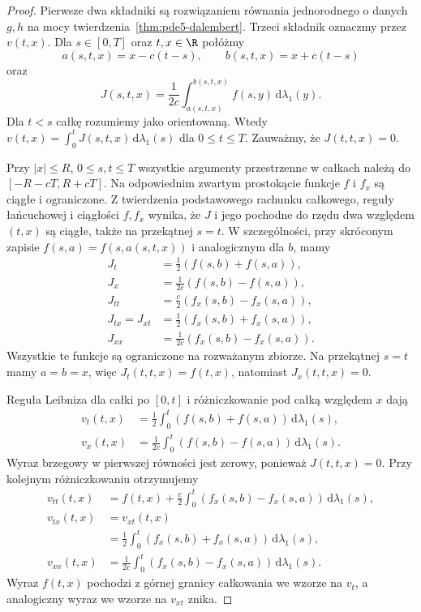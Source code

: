 \begin{proof}
Pierwsze dwa składniki są rozwiązaniem równania
jednorodnego o danych $g,h$ na mocy
twierdzenia~\ref{thm:pde5-dalembert}.
Trzeci składnik oznaczmy przez $v(t,x)$.
Dla $s\in[0,T]$ oraz $t,x\in\R$ połóżmy
\[
 a(s,t,x)=x-c(t-s),\qquad b(s,t,x)=x+c(t-s)
\]
oraz
\[
 J(s,t,x)=\frac1{2c}
 \int_{a(s,t,x)}^{b(s,t,x)}f(s,y)\,\mathrm d\lambda_1(y).
\]
Dla $t<s$ całkę rozumiemy jako orientowaną.
Wtedy $v(t,x)=\int_0^t J(s,t,x)\,\mathrm d\lambda_1(s)$
dla $0\leq t\leq T$. Zauważmy, że $J(t,t,x)=0$.

Przy $|x|\leq R$, $0\leq s,t\leq T$ wszystkie
argumenty przestrzenne w całkach należą do
$[-R-cT,R+cT]$. Na odpowiednim zwartym
prostokącie funkcje $f$ i $f_x$ są ciągłe
i ograniczone. Z twierdzenia podstawowego
rachunku całkowego, reguły łańcuchowej i
ciągłości $f,f_x$ wynika, że $J$ i jego
pochodne do rzędu dwa względem $(t,x)$
są ciągłe, także na przekątnej $s=t$.
W szczególności, przy skróconym zapisie
$f(s,a)=f(s,a(s,t,x))$ i analogicznym dla $b$,
mamy
\[
 \begin{aligned}
 J_t&=\tfrac12(f(s,b)+f(s,a)),\\
 J_x&=\tfrac1{2c}(f(s,b)-f(s,a)),\\
 J_{tt}&=\tfrac c2(f_x(s,b)-f_x(s,a)),\\
 J_{tx}=J_{xt}&=\tfrac12(f_x(s,b)+f_x(s,a)),\\
 J_{xx}&=\tfrac1{2c}(f_x(s,b)-f_x(s,a)).
 \end{aligned}
\]
Wszystkie te funkcje są ograniczone na rozważanym
zbiorze. Na przekątnej $s=t$ mamy $a=b=x$,
więc $J_t(t,t,x)=f(t,x)$, natomiast
$J_x(t,t,x)=0$.

Reguła Leibniza dla całki po $[0,t]$
i różniczkowanie pod całką względem $x$ dają
\[
 \begin{aligned}
 v_t(t,x)&=\tfrac12\int_0^t
       (f(s,b)+f(s,a))\,\mathrm d\lambda_1(s),\\
 v_x(t,x)&=\tfrac1{2c}\int_0^t
       (f(s,b)-f(s,a))\,\mathrm d\lambda_1(s).
 \end{aligned}
\]
Wyraz brzegowy w pierwszej równości jest zerowy,
ponieważ $J(t,t,x)=0$.
Przy kolejnym różniczkowaniu otrzymujemy
\[
 \begin{aligned}
 v_{tt}(t,x)&=f(t,x)+\tfrac c2\int_0^t
       (f_x(s,b)-f_x(s,a))\,\mathrm d\lambda_1(s),\\
 v_{tx}(t,x)&=v_{xt}(t,x)\\
 &=\tfrac12\int_0^t
       (f_x(s,b)+f_x(s,a))\,\mathrm d\lambda_1(s),\\
 v_{xx}(t,x)&=\tfrac1{2c}\int_0^t
       (f_x(s,b)-f_x(s,a))\,\mathrm d\lambda_1(s).
 \end{aligned}
\]
Wyraz $f(t,x)$ pochodzi z górnej granicy
całkowania we wzorze na $v_t$, a analogiczny
wyraz we wzorze na $v_{xt}$ znika.


\end{proof}
